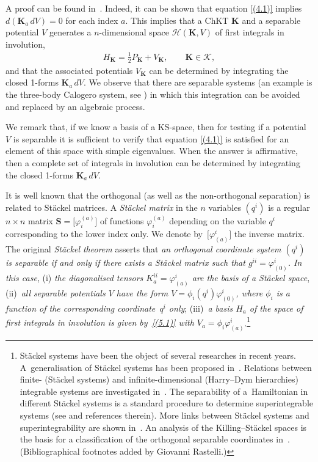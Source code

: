 \documentclass[10pt,a4paper]{amsart}
\def\bs{\boldsymbol}
\numberwithin{equation}{section}
\providecommand{\cal}{\mathcal}
\begin{document}
A proof can be found in~\cite{Benenti-1993}. Indeed, it can be shown that equation \eqref{(4.1)} implies $d(\bs K_a\,dV)=0$ for each index $a$. This implies that a ChKT $\bs K$ and a separable potential $V$ generates a $n$-dimensional space ${\cal H}(\bs K,V)$ of f\/irst integrals in involution,
\begin{gather*}
H_{\bs K}=\tfrac 12 P_{\bs K}+V_{\bs K}, \qquad \bs K\in \cal K,
\end{gather*}
and that the associated potentials $V_{\bs K}$ can be determined by integrating the closed 1-forms $\bs K_a\,dV$. We observe that there are separable systems (an example is the three-body Calogero system, see \cite{BCR-2000}) in which this integration can be avoided and replaced by an algebraic process.

We remark that, if we know a basis of a KS-space, then for testing if a potential $V$ is separable it is suf\/f\/icient to verify that equation \eqref{(4.1)} is satisf\/ied for an element of this space with simple eigenvalues. When the answer is af\/f\/irmative, then a complete set of integrals in involution can be determined by integrating the closed 1-forms $\bs K_a\,dV$.

It is well known that the orthogonal (as well as the non-orthogonal separation) is related to St\"ackel matrices. A {\it St\"ackel matrix} in the $n$ variables $(q^i)$ is a regular $n\times n$ matrix $\bs S=\big[\varphi_i^{(a)}\big]$ of functions $\varphi_i^{(a)}$ depending on the variable $q^i$ corresponding to the lower index only. We denote by~$\big[\varphi_{(a)}^i\big]$ the inverse matrix. The original {\it St\"ackel theorem}
asserts that {\it an orthogonal coordinate system $(q^i)$ is separable if and only if there exists a St\"ackel matrix such that $g^{ii}=\varphi_{(0)}^i$. In this case},  (i) {\it the diagonalised tensors $K_a^{ii}=\varphi_{(a)}^i$ are the basis of a St\"ackel space}, (ii)~{\it all separable potentials $V$ have the form $V=\phi_i(q^i) \varphi_{(0)}^i$,
where $\phi_i$ is a function of the corresponding coordinate~$q^i$ only};  (iii)~{\it a basis $H_a$  of the space of
f\/irst integrals in involution is given by~\eqref{(5.1)} with $V_a=\phi_i \varphi_{(a)}^i$}.\footnote{St\"ackel systems have been the object of several researches in recent years. A~generalisation of St\"ackel systems has been proposed in~\cite{Blaszak-Sergyeyev-2011}. Relations between f\/inite- (St\"ackel systems) and inf\/inite-dimensional (Harry--Dym hierarchies) integrable systems are investigated in~\cite{Marciniak-Blaszak-2010}. The separability of  a~Hamiltonian  in dif\/ferent St\"ackel systems is a standard procedure to determine  superintegrable systems (see \cite{Miller-Post-Winternitz-2013} and references therein). More links between St\"ackel systems and superintegrability are shown in~\cite{Tsiganov-2010}. An analysis of the Killing--St\"ackel spaces is the basis for a classif\/ication of the orthogonal separable coordinates  in~\cite{Rajaratnam-McLenaghan-2014}. (Bibliographical footnotes added by Giovanni Rastelli.)\label{pagenote1}}
\end{document}
